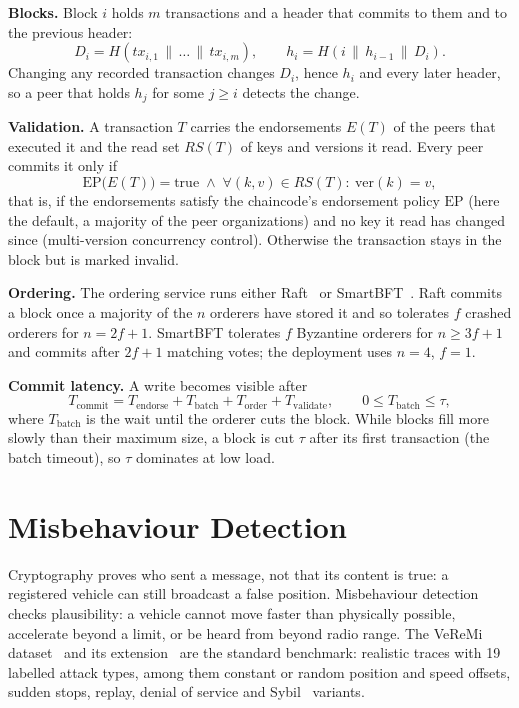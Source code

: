 \textbf{Blocks.} Block $i$ holds $m$ transactions and a header that commits to them and to the
previous header:
\begin{equation}
  D_i = H(\mathit{tx}_{i,1} \,\|\, \dots \,\|\, \mathit{tx}_{i,m}), \qquad
  h_i = H(i \,\|\, h_{i-1} \,\|\, D_i).
\end{equation}
Changing any recorded transaction changes $D_i$, hence $h_i$ and every later header, so a peer that
holds $h_j$ for some $j \ge i$ detects the change.

\textbf{Validation.} A transaction $T$ carries the endorsements $E(T)$ of the peers that executed it
and the read set $\mathit{RS}(T)$ of keys and versions it read. Every peer commits it only if
\begin{equation}
  \mathrm{EP}\bigl(E(T)\bigr) = \mathrm{true}
  \;\wedge\; \forall (k, v) \in \mathit{RS}(T):\ \mathrm{ver}(k) = v,
\end{equation}
that is, if the endorsements satisfy the chaincode's endorsement policy $\mathrm{EP}$ (here the
default, a majority of the peer organizations) and no key it read has changed since (multi-version
concurrency control). Otherwise the transaction stays in the block but is marked invalid.

\textbf{Ordering.} The ordering service runs either Raft~\cite{ongaro2014raft} or
SmartBFT~\cite{barger2021smartbft}. Raft commits a block once a majority of the $n$ orderers have
stored it and so tolerates $f$ crashed orderers for $n = 2f+1$. SmartBFT tolerates $f$ Byzantine
orderers for $n \ge 3f+1$~\cite{lamport1982byzantine,castro1999pbft} and commits after $2f+1$
matching votes; the deployment uses $n = 4$, $f = 1$.

\textbf{Commit latency.} A write becomes visible after
\begin{equation}
  T_{\mathrm{commit}} = T_{\mathrm{endorse}} + T_{\mathrm{batch}} + T_{\mathrm{order}}
  + T_{\mathrm{validate}}, \qquad 0 \le T_{\mathrm{batch}} \le \tau,
  \label{eq:commit}
\end{equation}
where $T_{\mathrm{batch}}$ is the wait until the orderer cuts the block. While blocks fill more slowly
than their maximum size, a block is cut $\tau$ after its first transaction (the batch timeout), so
$\tau$ dominates at low load.

\section{Misbehaviour Detection}

Cryptography proves who sent a message, not that its content is true: a registered vehicle can still
broadcast a false position. Misbehaviour detection checks plausibility: a vehicle cannot move faster
than physically possible, accelerate beyond a limit, or be heard from beyond radio range. The VeReMi
dataset~\cite{heijden2018veremi} and its extension~\cite{kamel2020veremiext} are the standard
benchmark: realistic traces with 19 labelled attack types, among them constant or random position
and speed offsets, sudden stops, replay, denial of service and Sybil~\cite{xiao2006sybil} variants.

